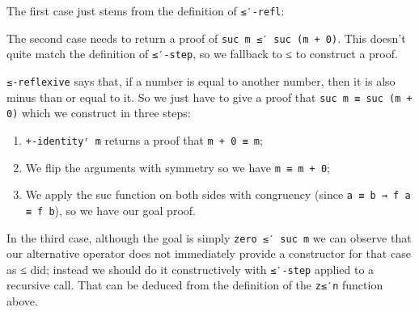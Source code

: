 {The first case just stems from the definition of \texttt{≤′-refl}:

\begin{code}%
\>[0]\AgdaSpace{}%
\AgdaSpace{}%
\AgdaSpace{}%
\AgdaSymbol{=}\AgdaSpace{}%
\<%
\end{code}

The second case needs to return a proof of \texttt{suc m ≤′ suc (m + 0)}. This doesn't quite match the definition of \texttt{≤′-step}, so we fallback to ≤ to construct a proof.

\texttt{≤-reflexive} says that, if a number is equal to another number, then it is also minus than or equal to it. So we just have to give a proof that \texttt{suc m ≡ suc (m + 0)} which we construct in three steps:

\begin{enumerate}
  \item \texttt{+-identityʳ m} returns a proof that \texttt{m + 0 ≡ m};
  \item We flip the arguments with symmetry so we have \texttt{m ≡ m + 0};
  \item We apply the suc function on both sides with congruency (since \texttt{a ≡ b → f a ≡ f b}), so we have our goal proof.
\end{enumerate}

\begin{code}%
\>[0]\AgdaSpace{}%
\AgdaSpace{}%
\AgdaSymbol{(}\AgdaSpace{}%
\AgdaSymbol{)}\AgdaSpace{}%
\AgdaSymbol{=}%
\>[22]\AgdaSpace{}%
\AgdaSymbol{(}\AgdaSpace{}%
\AgdaSymbol{(}\AgdaSpace{}%
\AgdaSpace{}%
\AgdaSymbol{(}\AgdaSpace{}%
\AgdaSymbol{(}\AgdaSpace{}%
\AgdaSymbol{))))}\<%
\end{code}

In the third case, although the goal is simply \texttt{zero ≤′ suc m} we can observe that our alternative operator does not immediately provide a constructor for that case as ≤ did; instead we should do it constructively with \texttt{≤′-step} applied to a recursive call. That can be deduced from the definition of the \texttt{z≤′n} function above.

\begin{code}%
\>[0]\AgdaSpace{}%
\AgdaSymbol{(}\AgdaSpace{}%
\AgdaSymbol{)}\AgdaSpace{}%
\AgdaSpace{}%
\AgdaSymbol{=}\AgdaSpace{}%
\AgdaSpace{}%
\AgdaSymbol{(}\AgdaSpace{}%
\AgdaSpace{}%
\AgdaSymbol{)}\<%
\end{code}

}

